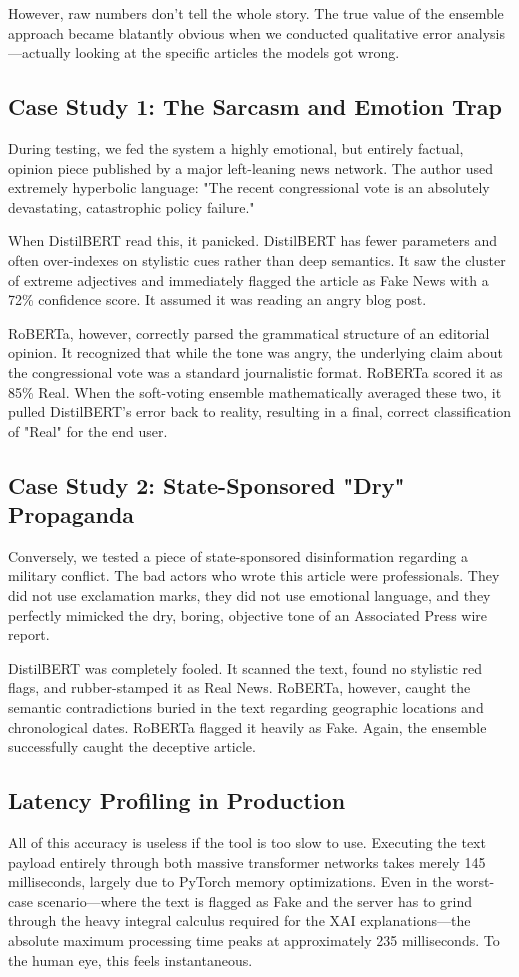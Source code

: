 \documentclass[conference]{IEEEtran}
\begin{document}
However, raw numbers don't tell the whole story. The true value of the ensemble approach became blatantly obvious when we conducted qualitative error analysis—actually looking at the specific articles the models got wrong.

\subsection{Case Study 1: The Sarcasm and Emotion Trap}
During testing, we fed the system a highly emotional, but entirely factual, opinion piece published by a major left-leaning news network. The author used extremely hyperbolic language: "The recent congressional vote is an absolutely devastating, catastrophic policy failure."

When DistilBERT read this, it panicked. DistilBERT has fewer parameters and often over-indexes on stylistic cues rather than deep semantics. It saw the cluster of extreme adjectives and immediately flagged the article as Fake News with a 72\% confidence score. It assumed it was reading an angry blog post.

RoBERTa, however, correctly parsed the grammatical structure of an editorial opinion. It recognized that while the tone was angry, the underlying claim about the congressional vote was a standard journalistic format. RoBERTa scored it as 85\% Real. When the soft-voting ensemble mathematically averaged these two, it pulled DistilBERT's error back to reality, resulting in a final, correct classification of "Real" for the end user.

\subsection{Case Study 2: State-Sponsored "Dry" Propaganda}
Conversely, we tested a piece of state-sponsored disinformation regarding a military conflict. The bad actors who wrote this article were professionals. They did not use exclamation marks, they did not use emotional language, and they perfectly mimicked the dry, boring, objective tone of an Associated Press wire report. 

DistilBERT was completely fooled. It scanned the text, found no stylistic red flags, and rubber-stamped it as Real News. RoBERTa, however, caught the semantic contradictions buried in the text regarding geographic locations and chronological dates. RoBERTa flagged it heavily as Fake. Again, the ensemble successfully caught the deceptive article.

\subsection{Latency Profiling in Production}
All of this accuracy is useless if the tool is too slow to use. Executing the text payload entirely through both massive transformer networks takes merely 145 milliseconds, largely due to PyTorch memory optimizations. Even in the worst-case scenario—where the text is flagged as Fake and the server has to grind through the heavy integral calculus required for the XAI explanations—the absolute maximum processing time peaks at approximately 235 milliseconds. To the human eye, this feels instantaneous.
\end{document}
